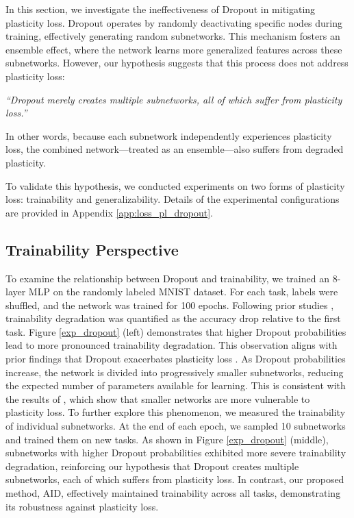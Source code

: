 

In this section, we investigate the ineffectiveness of Dropout in mitigating plasticity loss.
Dropout operates by randomly deactivating specific nodes during training, effectively generating random subnetworks.
This mechanism fosters an ensemble effect, where the network learns more generalized features across these subnetworks.
However, our hypothesis suggests that this process does not address plasticity loss:

\textit{``Dropout merely creates multiple subnetworks, all of which suffer from plasticity loss.''}

In other words, because each subnetwork independently experiences plasticity loss, the combined network—treated as an ensemble—also suffers from degraded plasticity.

To validate this hypothesis, we conducted experiments on two forms of plasticity loss: trainability and generalizability. Details of the experimental configurations are provided in Appendix \ref{app:loss_pl_dropout}.


\subsection{Trainability Perspective}
To examine the relationship between Dropout and trainability, we trained an 8-layer MLP on the randomly labeled MNIST dataset.
For each task, labels were shuffled, and the network was trained for 100 epochs.
Following prior studies \citep{lyle2023understanding, kumar2023maintaining}, trainability degradation was quantified as the accuracy drop relative to the first task.
Figure \ref{exp_dropout} (left) demonstrates that higher Dropout probabilities lead to more pronounced trainability degradation.
This observation aligns with prior findings that Dropout exacerbates plasticity loss \citep{dohare2024loss}.
As Dropout probabilities increase, the network is divided into progressively smaller subnetworks, reducing the expected number of parameters available for learning.
This is consistent with the results of \citet{lyle2023understanding}, which show that smaller networks are more vulnerable to plasticity loss.
To further explore this phenomenon, we measured the trainability of individual subnetworks.
At the end of each epoch, we sampled 10 subnetworks and trained them on new tasks.
As shown in Figure \ref{exp_dropout} (middle), subnetworks with higher Dropout probabilities exhibited more severe trainability degradation, reinforcing our hypothesis that Dropout creates multiple subnetworks, each of which suffers from plasticity loss.
In contrast, our proposed method, AID, effectively maintained trainability across all tasks, demonstrating its robustness against plasticity loss.

